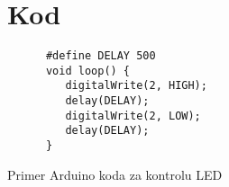 \documentclass[a4paper]{article}
\begin{document}
\section*{Kod}

\begin{listing}
   \begin{verbatim}
      #define DELAY 500
      void loop() {
         digitalWrite(2, HIGH);
         delay(DELAY);
         digitalWrite(2, LOW);
         delay(DELAY);
      }
   \end{verbatim}
   \label{ls:arduino}
   \caption{Primer Arduino koda za kontrolu LED}
\end{listing}
\end{document}
